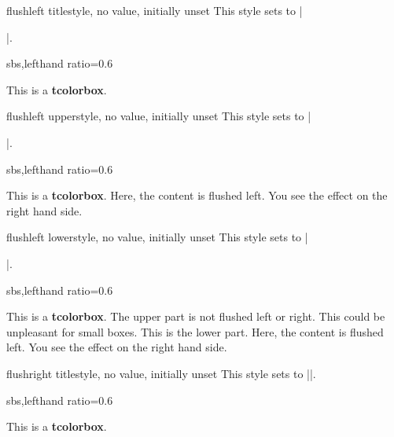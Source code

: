 \clearpage
\begin{docTcbKey}{flushleft title}{}{style, no value, initially unset}
  This style sets  to |\raggedright|.
\begin{dispExample*}{sbs,lefthand ratio=0.6}

\begin{tcolorbox}[title=My title which is
  quite long but always flushed left]
This is a \textbf{tcolorbox}.
\end{tcolorbox}
\end{dispExample*}
\end{docTcbKey}


\begin{docTcbKey}{flushleft upper}{}{style, no value, initially unset}
  This style sets  to |\raggedright|.
\begin{dispExample*}{sbs,lefthand ratio=0.6}

\begin{tcolorbox}[title=My title]
This is a \textbf{tcolorbox}. Here, the
content is flushed left.
You see the effect on the right hand side.
\end{tcolorbox}
\end{dispExample*}
\end{docTcbKey}


\begin{docTcbKey}{flushleft lower}{}{style, no value, initially unset}
  This style sets  to |\raggedright|.
\begin{dispExample*}{sbs,lefthand ratio=0.6}

\begin{tcolorbox}[title=My title]
This is a \textbf{tcolorbox}. The upper part
is not flushed left or right. This could be
unpleasant for small boxes.
\tcblower
This is the lower part. Here, the
content is flushed left.
You see the effect on the right hand side.
\end{tcolorbox}
\end{dispExample*}
\end{docTcbKey}


\clearpage
\begin{docTcbKey}{flushright title}{}{style, no value, initially unset}
  This style sets  to |\raggedleft|.
\begin{dispExample*}{sbs,lefthand ratio=0.6}

\begin{tcolorbox}[title=My title]
This is a \textbf{tcolorbox}.
\end{tcolorbox}
\end{dispExample*}
\end{docTcbKey}


